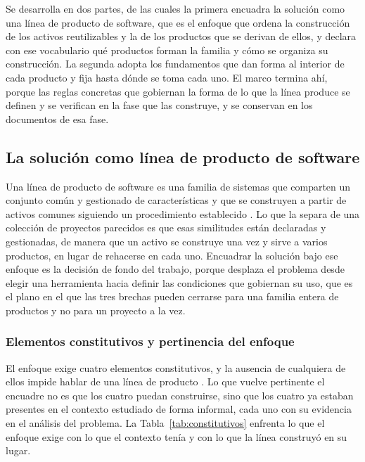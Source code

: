 Se desarrolla en dos partes, de las cuales la primera encuadra la
solución como una línea de producto de software, que es el enfoque que ordena
la construcción de los activos reutilizables y la de los productos que se
derivan de ellos, y declara con ese vocabulario qué productos forman la
familia y cómo se organiza su construcción. La segunda adopta los fundamentos
que dan forma al interior de cada producto y fija hasta dónde se toma cada
uno. El marco termina ahí, porque las reglas concretas que gobiernan la forma
de lo que la línea produce se definen y se verifican en la fase que las
construye, y se conservan en los documentos de esa fase.

\subsection{La solución como línea de producto de software}
\label{sec:caracterizacion-lps}

Una línea de producto de software es una familia de sistemas que comparten un
conjunto común y gestionado de características y que se construyen a partir de
activos comunes siguiendo un procedimiento establecido \citep{Clements2001}.
Lo que la separa de una colección de proyectos parecidos es que esas
similitudes están declaradas y gestionadas, de manera que un activo se
construye una vez y sirve a varios productos, en lugar de rehacerse en cada
uno. Encuadrar la solución bajo ese enfoque es la decisión de fondo del
trabajo, porque desplaza el problema desde elegir una herramienta hacia
definir las condiciones que gobiernan su uso, que es el plano en el que las
tres brechas pueden cerrarse para una familia entera de productos y no para un
proyecto a la vez.

\subsubsection*{Elementos constitutivos y pertinencia del enfoque}

El enfoque exige cuatro elementos constitutivos, y la ausencia de cualquiera
de ellos impide hablar de una línea de producto \citep{Clements2001}. Lo que
vuelve pertinente el encuadre no es que los cuatro puedan construirse, sino
que los cuatro ya estaban presentes en el contexto estudiado de forma
informal, cada uno con su evidencia en el análisis del problema. La
Tabla~\ref{tab:constitutivos} enfrenta lo que el enfoque exige con lo que el
contexto tenía y con lo que la línea construyó en su lugar.

